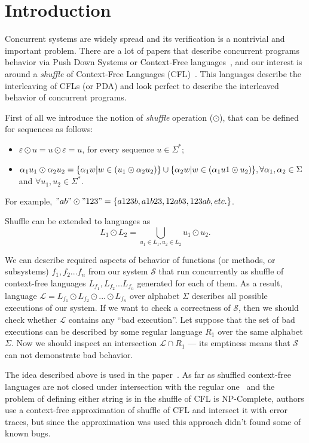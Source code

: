 \section{Introduction}

Concurrent systems are widely spread and its verification is a nontrivial and important problem.
There are a lot of papers that describe concurrent programs behavior via Push Down Systems or Context-Free languages~\cite{gange2015tool, bouajjani2003generic, chaki2006verifying, ModelPDA1}, and our interest is around a \textit{shuffle} of Context-Free Languages (CFL)~\cite{CFLShuffle}.
This languages describe the interleaving of CFLs (or PDA) and look perfect to describe the interleaved behavior of concurrent programs.

First of all we introduce the notion of \textit{shuffle} operation ($\odot$), that can be defined for sequences as follows:
\begin{itemize}
    \item $\varepsilon \odot u = u \odot \varepsilon = {u}$, for every sequence $ u \in \Sigma^*$;
    \item $\alpha_1 u_1 \odot \alpha_2 u_2 = \{\alpha_1 w | w \in (u_1 \odot \alpha_2 u_2) \} \cup \newline
    \{\alpha_2 w | w \in (\alpha_1 u1 \odot u_2 ) \},  \forall \alpha_1, \alpha_2 \in \Sigma$ and $\forall u_1, u_2 \in \Sigma^*$.
\end{itemize}
For example, $"ab" \odot "123" = \{a123b,a1b23, 12ab3, 123ab, etc.\}$.

Shuffle can be extended to languages as $$L_1 \odot L_2 = \bigcup\limits_{u_1\in L_1, u_2\in L_2} u_1 \odot u_2.$$

We can describe required aspects of behavior of functions (or methods, or subsystems) $f_1, f_2 ... f_n$ from our system $\mathcal{S}$ that run concurrently as shuffle of context-free languages $L_{f_1}, L_{f_2} ... L_{f_n}$ generated for each of them.
As a result, language  $\mathcal{L} = L_{f_1} \odot L_{f_2} \odot... \odot L_{f_n}$ over alphabet $\Sigma$ describes all possible executions of our system.
If we want to check a correctness of $\mathcal{S}$, then we should check whether $\mathcal{L}$ contains any ``bad execution''.
Let suppose that the set of bad executions can be described by some regular language $R_1$ over the same alphabet $\Sigma$.
Now we should inspect an intersection $\mathcal{L} \cap R_1$ --- its emptiness means that $\mathcal{S}$ can not demonstrate bad behavior.

The idea described above is used in the paper~\cite{stenman2011approximating}. 
As far as shuffled context-free languages are not closed under intersection with the regular one~\cite{CFLShuffle} and the problem of defining either string is in the shuffle of CFL is NP-Complete,
 authors use a context-free approximation of shuffle of CFL and intersect it with error traces, but since the approximation was used this approach didn't found some of known bugs. 

